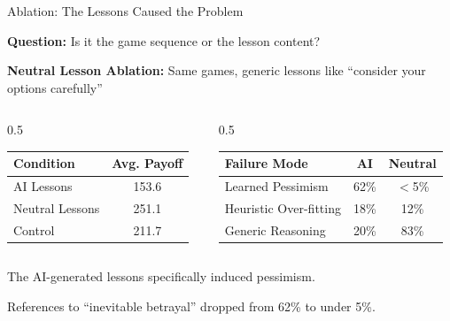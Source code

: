 \documentclass[aspectratio=169]{beamer}
\begin{document}
\begin{frame}{Ablation: The Lessons Caused the Problem}
  
  \textbf{Question:} Is it the game sequence or the lesson content?
  
  \vspace{0.5em}
  \textbf{Neutral Lesson Ablation:} Same games, generic lessons like ``consider your options carefully''
  
  \begin{columns}
    \begin{column}{0.5\textwidth}
      \begin{table}
        \centering
        \small
        \begin{tabular}{lc}
          \toprule
          Condition & Avg. Payoff \\
          \midrule
          AI Lessons & 153.6 \\
          Neutral Lessons & 251.1 \\
          Control & 211.7 \\
          \bottomrule
        \end{tabular}
      \end{table}
    \end{column}
    \begin{column}{0.5\textwidth}
      \begin{table}
        \centering
        \small
        \begin{tabular}{lcc}
          \toprule
          Failure Mode & AI & Neutral \\
          \midrule
          Learned Pessimism & 62\% & $<$5\% \\
          Heuristic Over-fitting & 18\% & 12\% \\
          Generic Reasoning & 20\% & 83\% \\
          \bottomrule
        \end{tabular}
      \end{table}
    \end{column}
  \end{columns}
  
  \vspace{1em}
  The AI-generated lessons specifically induced pessimism.
  
  References to ``inevitable betrayal'' dropped from 62\% to under 5\%.

\end{frame}
\end{document}
